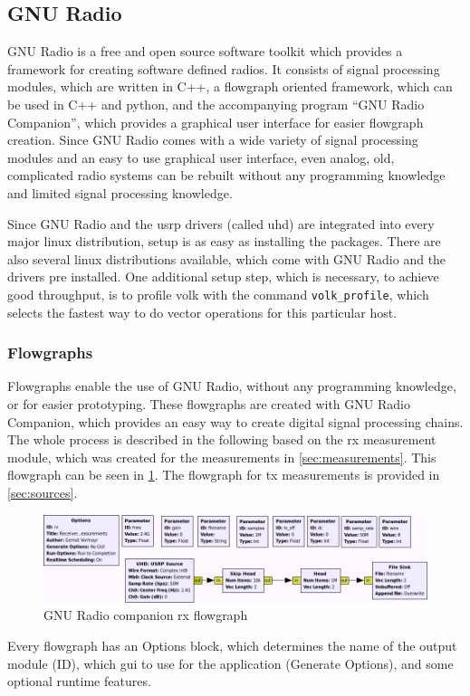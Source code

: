 \documentclass[12pt,a4paper,parskip=full,abstracton]{scrartcl}
\begin{document}
\subsection{GNU Radio}
\label{sec:intgnu}
GNU Radio is a free and open source software toolkit which provides a
framework for creating software defined radios. It consists
of signal processing modules, which are written in C++, a flowgraph oriented framework, which can be
used in C++ and python, and the accompanying program ``GNU Radio Companion''\cite{gnuradio_grc},
which provides a graphical user interface for easier flowgraph creation. Since GNU Radio comes
with a wide variety of signal processing modules and an easy to use graphical user interface,
even analog, old, complicated radio systems can be rebuilt without any programming knowledge
and limited signal processing knowledge\cite{isee3}.

Since GNU Radio and the \gls{usrp} drivers (called \gls{uhd}) are integrated into every
major linux distribution, setup is as easy as installing the packages. There are
also several linux distributions available, which come with GNU Radio and the drivers
pre installed. One additional setup step, which is necessary, to achieve good throughput,
is to profile \gls{volk} with the command \verb+volk_profile+, which selects the
fastest way to do vector operations for this particular host\cite{gnuradio_volk}.

\subsubsection{Flowgraphs}
Flowgraphs enable the use of GNU Radio, without any programming knowledge, or
for easier prototyping. These flowgraphs are created with GNU Radio Companion, which
provides an easy way to create digital signal processing chains. The whole process
is described in the following based on the \gls{rx} measurement module, which was
created for the measurements in \cref{sec:measurements}. This flowgraph can be seen in
\cref{fig:grc_rx}. The flowgraph for \gls{tx} measurements is provided in \cref{sec:sources}.

\begin{figure}[htb]
    \centering
    \includegraphics[width=\linewidth]{grc}
    \caption{GNU Radio companion \gls{rx} flowgraph}
    \label{fig:grc_rx}
\end{figure}
Every flowgraph has an {\ttfamily Options} block, which determines the name of the output module ({\ttfamily ID}),
which \gls{gui} to use for the application ({\ttfamily Generate Options}), and some optional runtime features.
\end{document}

